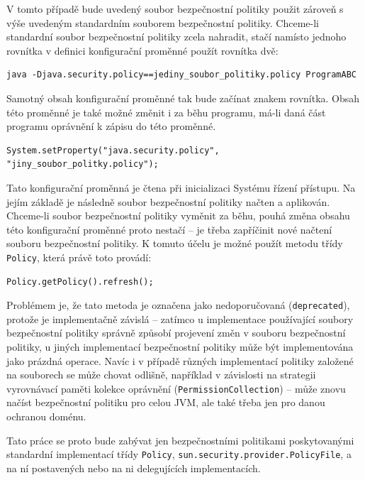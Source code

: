 V tomto případě bude uvedený soubor bezpečnostní politiky použit zároveň s výše uvedeným standardním souborem bezpečnostní politiky. Chceme-li standardní soubor bezpečnostní politiky zcela nahradit, stačí namísto jednoho rovnítka v definici konfigurační proměnné použít rovnítka dvě: \cite[5.3.1]{oaks}

\begin{verbatim}
java -Djava.security.policy==jediny_soubor_politiky.policy ProgramABC
\end{verbatim}

Samotný obsah konfigurační proměnné tak bude začínat znakem rovnítka. Obsah této proměnné je také možné změnit i za běhu programu, má-li daná část programu oprávnění k zápisu do této proměnné.

\begin{verbatim}
System.setProperty("java.security.policy", "jiny_soubor_politky.policy");
\end{verbatim}

Tato konfigurační proměnná je čtena při inicializaci Systému řízení přístupu. Na jejím základě je následně soubor bezpečnostní politiky načten a aplikován. Chceme-li soubor bezpečnostní politiky vyměnit za běhu, pouhá změna obsahu této konfigurační proměnné proto nestačí -- je třeba zapříčinit nové načtení souboru bezpečnostní politiky. K tomuto účelu je možné použít metodu třídy {\tt Policy}, která právě toto provádí:

\begin{verbatim}
Policy.getPolicy().refresh();
\end{verbatim}

Problémem je, že tato metoda je označena jako nedoporučovaná ({\tt deprecated}), protože je implementačně závislá -- zatímco u implementace používající soubory bezpečnostní politiky správně způsobí projevení změn v souboru bezpečnostní politiky, u jiných implementací bezpečnostní politiky může být implementována jako prázdná operace. Navíc i v případě různých implementací politiky založené na souborech se může chovat odlišně, například v závislosti na strategii vyrovnávací paměti kolekce oprávnění ({\tt PermissionCollection}) -- může znovu načíst bezpečnostní politiku pro celou JVM, ale také třeba jen pro danou ochranou doménu. \cite{refPolicy}

Tato práce se proto bude zabývat jen bezpečnostními politikami poskytovanými standardní implementací třídy {\tt Policy}, {\tt sun.security.provider.PolicyFile}, a na ní postavených nebo na ni delegujících implementacích.

